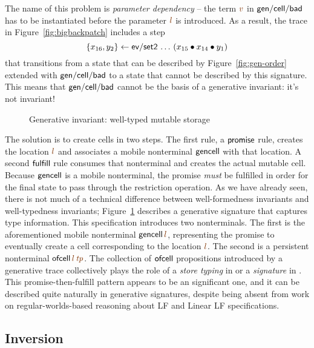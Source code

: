 The name of this problem is {\it parameter dependency} -- the term
$\lf{v}$ in ${\sf gen/cell/bad}$ has to be instantiated before the
parameter $\lf{l}$ is introduced. As a result, the trace in
Figure~\ref{fig:bigbackpatch} includes a step
\[\{{x_{16},y_2}\} \leftarrow {{\sf
    ev/set2}\,\ldots\,({x_{15}} \mathbin{\bullet}{{x_{14}} \mathbin{\bullet}{y_1}})}\] that
transitions from a state that can be described by
Figure~\ref{fig:gen-order} extended with ${\sf gen/cell/bad}$ to a
state that cannot be described by this signature. This means that
${\sf gen/cell/bad}$ cannot be the basis of a 
generative invariant: it's not invariant!

\begin{figure}[t]
\caption{Generative invariant: well-typed mutable storage}
\label{fig:gen-state} 
\end{figure}

The solution is to create cells in two steps. The first rule, a ${\sf
  promise}$ rule, creates the location $\lf{l}$ and associates a
mobile nonterminal ${\sf gencell}$ with that location. A second ${\sf
  fulfill}$ rule consumes that nonterminal and creates the actual
mutable cell.  Because ${\sf gencell}$ is a mobile nonterminal, the
promise {\it must} be fulfilled in order for the final state to pass
through the restriction operation. As we have already seen, there is
not much of a technical difference between well-formedness invariants
and well-typedness invariants; Figure~\ref{fig:gen-state} describes a
generative signature that captures type information.  This
specification introduces two nonterminals. The first is the
aforementioned mobile nonterminal ${\sf gencell}\,\lf{l}$,
representing the promise to eventually create a cell corresponding to
the location $\lf{l}$.  The second is a persistent nonterminal ${\sf
  ofcell}\,\lf{l}\,\lf{\it tp}$. The collection of ${\sf ofcell}$
propositions introduced by a generative trace collectively plays the
role of a {\it store typing} in \cite[Chapter 13]{pierce02types} or a
{\it signature} in \cite[Chapter 35]{harper12practical}. This
promise-then-fulfill pattern appears to be an significant one, and it
can be described quite naturally in generative signatures, despite
being absent from work on regular-worlds-based reasoning about LF
and Linear LF specifications.

\subsection{Inversion}

